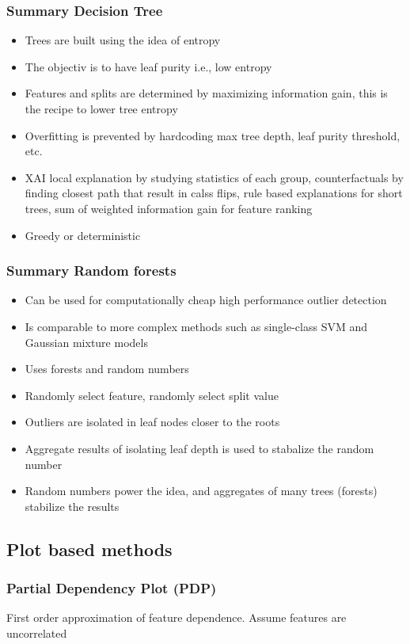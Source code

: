 \subsubsection{Summary Decision Tree}
\begin{itemize}
    \item Trees are built using the idea of entropy
    \item The objectiv is to have leaf purity i.e., low entropy
    \item Features and splits are determined by maximizing information gain, this is the recipe to lower tree entropy
    \item Overfitting is prevented by hardcoding max tree depth, leaf purity threshold, etc.
    \item XAI local explanation by studying statistics of each group, counterfactuals by finding closest path that result in calss flips, rule based explanations for short trees, sum of weighted information gain for feature ranking
    \item Greedy or deterministic
\end{itemize}
\subsubsection{Summary Random forests}
\begin{itemize}
    \item Can be used for computationally cheap high performance outlier detection
    \item Is comparable to more complex methods such as single-class SVM and Gaussian mixture models
    \item Uses forests and random numbers
    \item Randomly select feature, randomly select split value
    \item Outliers are isolated in leaf nodes closer to the roots
    \item Aggregate results of isolating leaf depth is used to stabalize the random number
    \item Random numbers power the idea, and aggregates of many trees (forests) stabilize the results
\end{itemize}

\subsection{Plot based methods}
\subsubsection{Partial Dependency Plot (PDP)}
First order approximation of feature dependence. Assume features are uncorrelated

